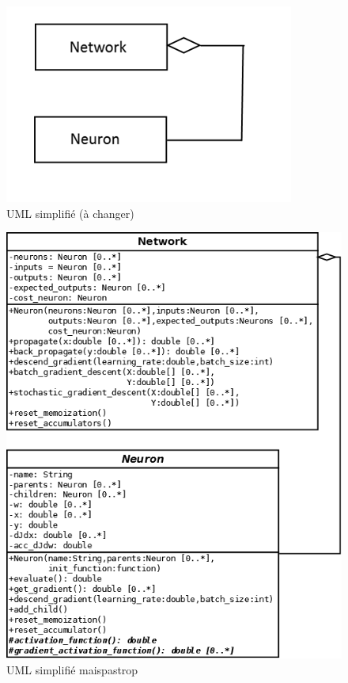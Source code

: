 \documentclass{report}
\theoremstyle{plain}
\theoremstyle{definition}
\theoremstyle{remark}
\begin{document}
\begin{figure}
\begin{center}
\includegraphics[scale=0.5]{images/uml_simplifie_imp1.png}
\caption{UML simplifié (à changer)}
\label{UML simplifié}
\end{center}
\end{figure}

\begin{figure}
\begin{center}
\includegraphics[scale=0.3]{images/uml_simplifie_maispastrop_imp1.png}
\caption{UML simplifié maispastrop}
\label{UML simplifié maispastrop}
\end{center}
\end{figure}
\end{document}
